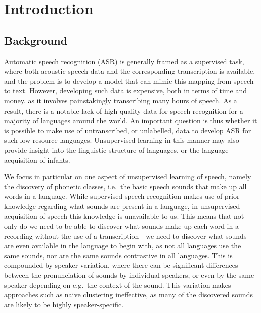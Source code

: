 %
%
%

% 

\chapter{Introduction}
\section{Background}
Automatic speech recognition (ASR) is generally framed as a supervised task, where both acoustic speech data and the corresponding transcription is available, and the problem is to develop a model that can mimic this mapping from speech to text.
However, developing such data is expensive, both in terms of time and money, as it involves painstakingly transcribing many hours of speech.
As a result, there is a notable lack of high-quality data for speech recognition for a majority of languages around the world.
An important question is thus whether it is possible to make use of untranscribed, or unlabelled, data to develop ASR for such low-resource languages.
Unsupervised learning in this manner may also provide insight into the linguistic structure of languages, or the language acquisition of infants.

We focus in particular on one aspect of unsupervised learning of speech, namely the discovery of phonetic classes, i.e.\ the basic speech sounds that make up all words in a language.
While supervised speech recognition makes use of prior knowledge regarding what sounds are present in a language, in unsupervised acquisition of speech this knowledge is unavailable to us.
This means that not only do we need to be able to discover what sounds make up each word in a recording without the use of a transcription---we need to discover what sounds are even available in the language to begin with, as not all languages use the same sounds, nor are the same sounds contrastive in all languages.
This is compounded by speaker variation, where there can be significant differences between the pronunciation of sounds by individual speakers, or even by the same speaker depending on e.g.\ the context of the sound.
This variation makes approaches such as naive clustering ineffective, as many of the discovered sounds are likely to be highly speaker-specific.

